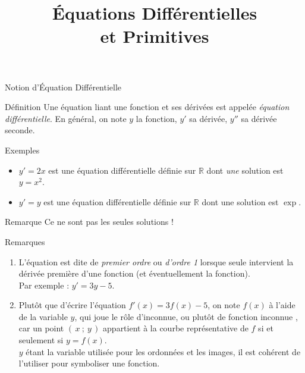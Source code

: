 \documentclass{cours}
\title{Équations Différentielles \\ et Primitives}
\begin{document}

    \begin{Gpartie}{Notion d'Équation Différentielle} 
        \begin{Spartie}{Définition} 
            Une équation liant une fonction et ses dérivées est appelée \emph{équation différentielle}. En général, on note $y$ la fonction, $y'$ sa dérivée, $y''$ sa dérivée seconde.
        \end{Spartie}
        \begin{Spartie}{Exemples} 
            \begin{itemize}
                \item $y'=2x$ est une équation différentielle définie sur $\mathbb{R}$ dont \textit{une} solution est~$y=x^2$.
                \item $y'=y$ est une équation différentielle définie sur $\mathbb{R}$ dont une solution est $\exp$.
            \end{itemize}
            \begin{SSpartie}{Remarque} 
                Ce ne sont pas les seules solutions !
            \end{SSpartie}
        \end{Spartie}
        \begin{Spartie}{Remarques} 
            \begin{enumerate}[(1)]
                \item L'équation est dite de \emph{premier ordre} ou \emph{d'ordre 1} lorsque seule intervient la dérivée première d'une fonction (et éventuellement la fonction). \\ Par exemple : $y'=3y-5$.
                \item Plutôt que d'écrire l'équation $f'(x)=3f(x)-5$, on note $f(x)$ à l'aide de la variable $y$, qui joue le rôle d'inconnue, ou plutôt de \og fonction inconnue \fg{}, car un point $(\,x~;~y\,)$ appartient à la courbe représentative de $f$ si et seulement si $y=f(x)$. \\ $y$ étant la variable utilisée pour les ordonnées et les images, il est cohérent de l'utiliser pour symboliser une fonction.
            \end{enumerate}
        \end{Spartie}
    \end{Gpartie}
\end{document}
